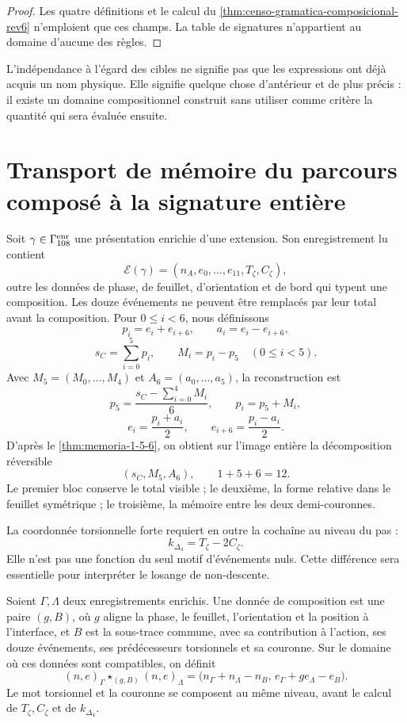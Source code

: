 \begin{proof}
Les quatre définitions et le calcul du \cref{thm:censo-gramatica-composicional-rev6} n’emploient que ces champs. La table de signatures n’appartient au domaine d’aucune des règles.
\end{proof}

L’indépendance à l’égard des cibles ne signifie pas que les expressions ont déjà acquis un nom physique. Elle signifie quelque chose d’antérieur et de plus précis : il existe un domaine compositionnel construit sans utiliser comme critère la quantité qui sera évaluée ensuite.

\section{Transport de mémoire du parcours composé à la signature entière}
\label{sec:memoria-composicion-especies-rev6}

Soit \(\gamma\in\Gamma_{108}^{\rm enr}\) une présentation enrichie d’une extension. Son enregistrement lu contient
\[
 \mathcal E(\gamma)
 =
 (n_A,e_0,\ldots,e_{11},T_\zeta,C_\zeta),
\]
outre les données de phase, de feuillet, d’orientation et de bord qui typent une composition. Les douze événements ne peuvent être remplacés par leur total avant la composition. Pour \(0\le i<6\), nous définissons
\[
 p_i=e_i+e_{i+6},
 \qquad
 a_i=e_i-e_{i+6},
\]
\[
 s_C=\sum_{i=0}^{5}p_i,
 \qquad
 M_i=p_i-p_5\quad(0\le i<5).
\]
Avec \(M_5=(M_0,\ldots,M_4)\) et \(A_6=(a_0,\ldots,a_5)\), la reconstruction est
\[
 p_5=\frac{s_C-\sum_{i=0}^{4}M_i}{6},
 \qquad
 p_i=p_5+M_i,
\]
\[
 e_i=\frac{p_i+a_i}{2},
 \qquad
 e_{i+6}=\frac{p_i-a_i}{2}.
\]
D’après le \cref{thm:memoria-1-5-6}, on obtient sur l’image entière la décomposition réversible
\[
 \boxed{(s_C,M_5,A_6),\qquad 1+5+6=12.}
\]
Le premier bloc conserve le total visible ; le deuxième, la forme relative dans le feuillet symétrique ; le troisième, la mémoire entre les deux demi-couronnes.

La coordonnée torsionnelle forte requiert en outre la cochaîne au niveau du pas :
\[
 k_{\Delta_4}=T_\zeta-2C_\zeta.
\]
Elle n’est pas une fonction du seul motif d’événements nuls. Cette différence sera essentielle pour interpréter le losange de non-descente.

\begin{definition}
\label{def:dato-empalme-orientado-rev6} Soient \(\Gamma,\Lambda\) deux enregistrements enrichis. Une donnée de composition est une paire \((g,B)\), où \(g\) aligne la phase, le feuillet, l’orientation et la position à l’interface, et \(B\) est la sous-trace commune, avec sa contribution à l’action, ses douze événements, ses prédécesseurs torsionnels et sa couronne. Sur le domaine où ces données sont compatibles, on définit
\[
 \boxed{
 {(n,e)}_\Gamma\star_{(g,B)}{(n,e)}_\Lambda
 =
 \bigl(
 n_\Gamma+n_\Lambda-n_B,\,
 e_\Gamma+g e_\Lambda-e_B
 \bigr).}
\]
Le mot torsionnel et la couronne se composent au même niveau, avant le calcul de \(T_\zeta,C_\zeta\) et de \(k_{\Delta_4}\).
\end{definition}

